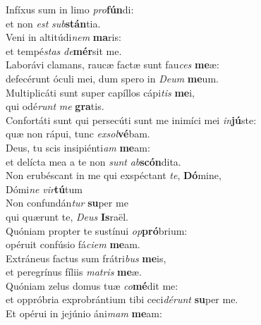 \evenverse Infíxus sum in limo \textit{pro}\textbf{fún}di:~\*\\
\evenverse et non \textit{est} \textit{sub}\textbf{stán}tia.\\
\oddverse Veni in altitúdi\textit{nem} \textbf{ma}ris:~\*\\
\oddverse et tempé\textit{stas} \textit{de}\textbf{mér}sit me.\\
\evenverse Laborávi clamans, raucæ factæ sunt fau\textit{ces} \textbf{me}æ:~\*\\
\evenverse defecérunt óculi mei, dum spero in \textit{De}\textit{um} \textbf{me}um.\\
\oddverse Multiplicáti sunt super capíllos cápi\textit{tis} \textbf{me}i,~\*\\
\oddverse qui odé\textit{runt} \textit{me} \textbf{gra}tis.\\
\evenverse Confortáti sunt qui persecúti sunt me inimíci mei \textit{in}\textbf{jú}ste:~\*\\
\evenverse quæ non rápui, tunc \textit{ex}\textit{sol}\textbf{vé}bam.\\
\oddverse Deus, tu scis insipiénti\textit{am} \textbf{me}am:~\*\\
\oddverse et delícta mea a te non \textit{sunt} \textit{ab}\textbf{scón}dita.\\
\evenverse Non erubéscant in me qui exspéctant \textit{te}, \textbf{Dó}mine,~\*\\
\evenverse Dómi\textit{ne} \textit{vir}\textbf{tú}tum\\
\oddverse Non confundán\textit{tur} \textbf{su}per me~\*\\
\oddverse qui quærunt te, \textit{De}\textit{us} \textbf{Is}raël.\\
\evenverse Quóniam propter te sustínui \textit{op}\textbf{pró}brium:~\*\\
\evenverse opéruit confúsio fá\textit{ci}\textit{em} \textbf{me}am.\\
\oddverse Extráneus factus sum frátri\textit{bus} \textbf{me}is,~\*\\
\oddverse et peregrínus fíliis \textit{ma}\textit{tris} \textbf{me}æ.\\
\evenverse Quóniam zelus domus tuæ \textit{co}\textbf{mé}dit me:~\*\\
\evenverse et oppróbria exprobrántium tibi ceci\textit{dé}\textit{runt} \textbf{su}per me.\\
\oddverse Et opérui in jejúnio áni\textit{mam} \textbf{me}am:~\*\\
